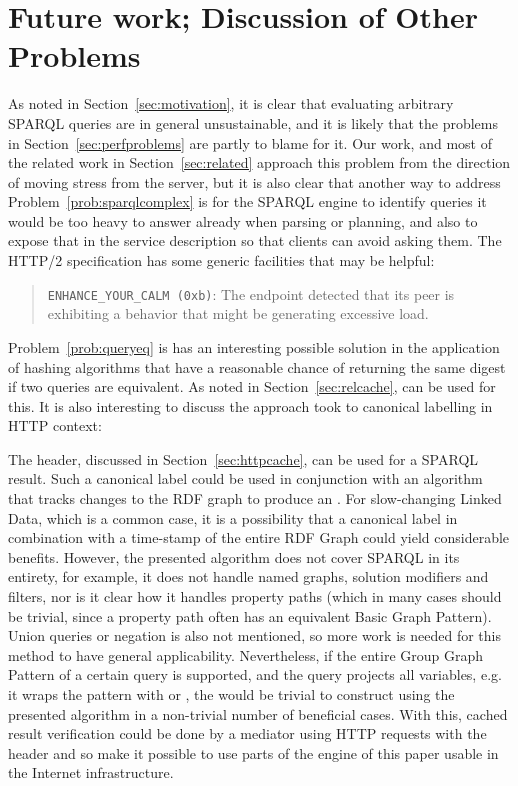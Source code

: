 

\section[Future Work]{Future work; Discussion of Other Problems}\label{sec:future}

As noted in Section~\ref{sec:motivation}, it is clear that evaluating
arbitrary SPARQL queries are in general unsustainable, and it is
likely that the problems in Section~\ref{sec:perfproblems} are partly
to blame for it. Our work, and most of the related work in
Section~\ref{sec:related} approach this problem from the direction of
moving stress from the server, but it is also clear that another way
to address Problem~\ref{prob:sparqlcomplex} is for the SPARQL engine
to identify queries it would be too heavy to answer already when
parsing or planning, and also to expose that in the service description
so that clients can avoid asking them. The HTTP/2 specification
\cite{rfc7540} has some generic facilities that may be helpful: 

\begin{quote}
\texttt{ENHANCE\_YOUR\_CALM (0xb)}:  The endpoint detected that its peer is
      exhibiting a behavior that might be generating excessive load.
\end{quote}

Problem~\ref{prob:queryeq} is has an interesting possible solution in
the application of hashing algorithms that have a reasonable chance of
returning the same digest if two queries are equivalent. As noted in
Section~\ref{sec:relcache}, \cite{kaseicache} can be used for this. It
is also interesting to discuss the approach \cite{papailiou2015graph}
took to canonical labelling in HTTP context:

The  header, discussed in Section~\ref{sec:httpcache}, can
be used for a SPARQL result. Such a canonical label could be used in
conjunction with an algorithm that tracks changes to the RDF graph to
produce an . For slow-changing Linked Data, which is a
common case, it is a possibility that a canonical label in combination
with a time-stamp of the entire RDF Graph could yield considerable
benefits. However, the presented algorithm does not cover SPARQL in
its entirety, for example, it does not handle named graphs, solution
modifiers and filters, nor is it clear how it handles property paths
(which in many cases should be trivial, since a property path often
has an equivalent Basic Graph Pattern). Union queries or negation is
also not mentioned, so more work is needed for this method to have
general applicability. Nevertheless, if the entire Group Graph Pattern
of a certain query is supported, and the query projects all variables,
e.g. it wraps the pattern with  or
, the  would be trivial to construct
using the presented algorithm in a non-trivial number of beneficial
cases. With this, cached result verification could be done by a
mediator using HTTP requests with the  header and
so make it possible to use parts of the engine of this paper usable in
the Internet infrastructure.


